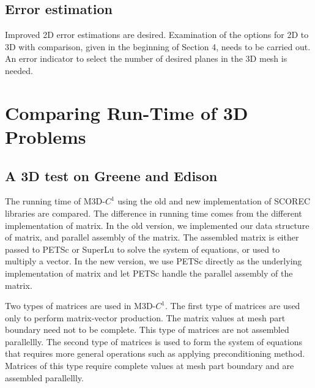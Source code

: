 \documentclass[11pt]{article}  %
\begin{document}
\subsection{Error estimation}
Improved 2D error estimations are desired. Examination of the options for 2D to 3D with comparison, given in the beginning of Section 4, needs to be carried out. An error indicator to select the number of desired planes in the 3D mesh is needed.

\section{Comparing Run-Time of 3D Problems} \label{sec:issues}
\subsection{A 3D test on Greene and Edison}
The running time of M3D-$C^1$ using the old and new implementation of SCOREC libraries are compared. The difference in running time comes from the different implementation of matrix. In the old version, we implemented our data structure of matrix, and parallel assembly of the matrix. The assembled matrix is either passed to PETSc or SuperLu to solve the system of equations, or used to multiply a vector.  In the new version, we use PETSc directly as the underlying implementation of matrix and let PETSc handle the parallel assembly of the matrix.

Two types of matrices are used in M3D-$C^1$. The first type of matrices are used only to perform matrix-vector production.  The matrix values at mesh part boundary need not to be complete. This type of matrices are not assembled parallellly. The second type of matrices is used to form the system of equations that requires more general operations such as applying preconditioning method.   Matrices of this type require complete values at mesh part boundary and are assembled parallellly.
\end{document}
